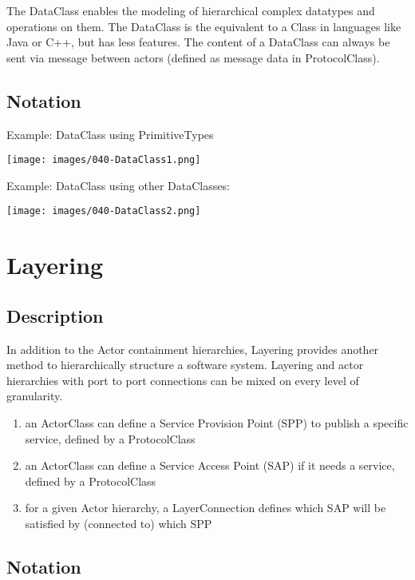 The DataClass enables the modeling of hierarchical complex datatypes and operations on them. The DataClass is the equivalent to a Class in languages like Java or C++, but has less features. The content of a DataClass can always be sent via message between actors (defined as message data in ProtocolClass).

\subsection{Notation}
  
Example: DataClass using PrimitiveTypes

\texttt{[image: images/040-DataClass1.png]}

Example: DataClass using other DataClasses:

\texttt{[image: images/040-DataClass2.png]}

\section{Layering}

\subsection{Description}

In addition to the Actor containment hierarchies, Layering provides another method to hierarchically structure a software system. Layering and actor hierarchies with port to port connections can be mixed on every level of granularity.
\begin{enumerate}
\item an ActorClass can define a Service Provision Point (SPP) to publish a specific service, defined by a ProtocolClass
\item an ActorClass can define a Service Access Point (SAP) if it needs a service, defined by a ProtocolClass
\item for a given Actor hierarchy, a LayerConnection defines which SAP will be satisfied by (connected to) which SPP
\end{enumerate}

\subsection{Notation}

